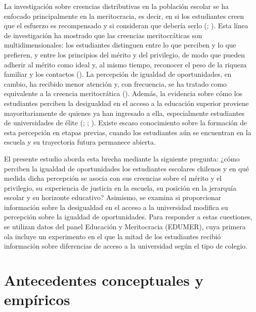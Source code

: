 \documentclass[
  spanish,
  a4paper,
  oneside]{scrbook}
\begin{document}
La investigación sobre creencias distributivas en la población escolar
se ha enfocado principalmente en la meritocracia, es decir, en si los
estudiantes creen que el esfuerzo es recompensado y si consideran que
debería serlo (; ). Esta línea de investigación ha mostrado que las creencias
meritocráticas son multidimensionales: los estudiantes distinguen entre
lo que perciben y lo que prefieren, y entre los principios del mérito y
del privilegio, de modo que pueden adherir al mérito como ideal y, al
mismo tiempo, reconocer el peso de la riqueza familiar y los contactos
(). La percepción de
igualdad de oportunidades, en cambio, ha recibido menor atención y, con
frecuencia, se ha tratado como equivalente a la creencia meritocrática
(). Además, la
evidencia sobre cómo los estudiantes perciben la desigualdad en el
acceso a la educación superior proviene mayoritariamente de quienes ya
han ingresado a ella, especialmente estudiantes de universidades de
élite (;
;
).
Existe escaso conocimiento sobre la formación de esta percepción en
etapas previas, cuando los estudiantes aún se encuentran en la escuela y
su trayectoria futura permanece abierta.

El presente estudio aborda esta brecha mediante la siguiente pregunta:
¿cómo perciben la igualdad de oportunidades los estudiantes escolares
chilenos y en qué medida dicha percepción se asocia con sus creencias
sobre el mérito y el privilegio, su experiencia de justicia en la
escuela, su posición en la jerarquía escolar y su horizonte educativo?
Asimismo, se examina si proporcionar información sobre la desigualdad en
el acceso a la universidad modifica su percepción sobre la igualdad de
oportunidades. Para responder a estas cuestiones, se utilizan datos del
panel Educación y Meritocracia (EDUMER), cuya primera ola incluye un
experimento en el que la mitad de los estudiantes recibió información
sobre diferencias de acceso a la universidad según el tipo de colegio.


\chapter{Antecedentes conceptuales y
empíricos}\label{antecedentes-conceptuales-y-empuxedricos}
\end{document}
